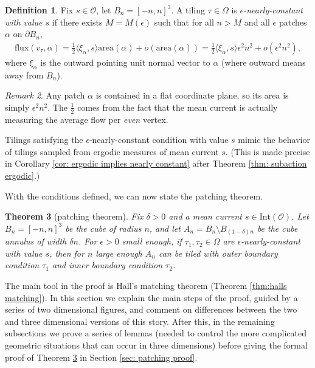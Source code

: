 \documentclass[11pt]{article}
\newtheorem{thm}{Theorem}[subsection]
\theoremstyle{remark}
\newtheorem{rem}[thm]{Remark}
\theoremstyle{definition}
\newtheorem{definition}[thm]{Definition}
\newcommand{\mc}[1]{\mathcal{#1}}
\newcommand{\termindex}[1]{\index{{\textbf{Terms}}!#1}}
\begin{document}
\begin{definition}\label{def:nearly constant}
    Fix $s\in \mc O$, let $B_n=[-n,n]^3$. A tiling $\tau\in \Omega$ is \textit{$\epsilon$-nearly-constant with value $s$} if there exists $M=M(\epsilon)$ such that for all $n>M$ and all $\epsilon$ patches $\alpha$ on $\partial B_n$, 
    \begin{align*}
        \text{flux}(v_\tau, \alpha) = \frac{1}{2}\langle \xi_\alpha, s\rangle \text{area}(\alpha) + o(\text{area}(\alpha)) = \frac{1}{2}\langle \xi_\alpha, s\rangle \epsilon^2 n^2 + o(\epsilon^2 n^2),
    \end{align*}
    where $\xi_\alpha$ is the outward pointing unit normal vector to $\alpha$ (where outward means away from $B_n$). \termindex{Chapter 6!$\epsilon$-nearly-constant}
\end{definition}
\begin{rem}
    Any patch $\alpha$ is contained in a flat coordinate plane, so its area is simply $\epsilon^2n^2$. The $\frac{1}{2}$ comes from the fact that the mean current is actually measuring the average flow per \textit{even} vertex. 

    Tilings satisfying the $\epsilon$-nearly-constant condition with value $s$ mimic the behavior of tilings sampled from ergodic measures of mean current $s$. (This is made precise in Corollary \ref{cor: ergodic implies nearly constant} after Theorem \ref{thm: subaction ergodic}.)
\end{rem}
With the conditions defined, we can now state the patching theorem. 
\begin{thm}[patching theorem]\label{patching}
    Fix $\delta>0$ and a mean current $s\in \text{Int}(\mc O)$. Let $B_n=[-n,n]^3$ be the cube of radius $n$, and let $A_n = B_n\setminus B_{(1-\delta) n}$ be the cube annulus of width $\delta n$. For $\epsilon>0$ small enough, if $\tau_1,\tau_2\in \Omega$ are $\epsilon$-nearly-constant with value $s$, then for $n$ large enough $A_n$ can be tiled with outer boundary condition $\tau_1$ and inner boundary condition $\tau_2$. 
\end{thm}
The main tool in the proof is Hall's matching theorem (Theorem \ref{thm:halls matching}). In this section we explain the main steps of the proof, guided by a series of two dimensional figures, and comment on differences between the two and three dimensional versions of this story. After this, in the remaining subsections we prove a series of lemmas (needed to control the more complicated geometric situations that can occur in three dimensions) before giving the formal proof of Theorem \ref{patching} in Section \ref{sec: patching proof}. 
\end{document}
